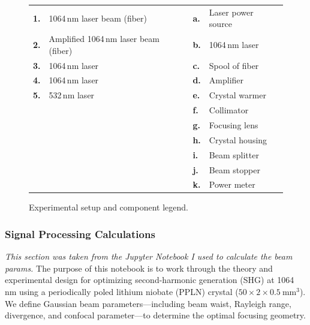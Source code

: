 \documentclass[11pt, letterpaper]{article}
\begin{document}
\begin{figure}[htbp]
{\begin{tikzpicture}[font=\sffamily]
    \end{tikzpicture}
    }
    \vspace{.5cm} %
    \renewcommand{\arraystretch}{1.2} %
    \small %
    \begin{tabular}{@{}ll | ll@{}}
        \textbf{1.} & 1064\,nm laser beam (fiber)           & \textbf{a.} & Laser power source \\
        \textbf{2.} & Amplified 1064\,nm laser beam (fiber) & \textbf{b.} & 1064\,nm laser \\
        \textbf{3.} & 1064\,nm laser                        & \textbf{c.} & Spool of fiber \\
        \textbf{4.} & 1064\,nm laser                        & \textbf{d.} & Amplifier \\
        \textbf{5.} & 532\,nm laser                         & \textbf{e.} & Crystal warmer \\
                    &                                       & \textbf{f.} & Collimator \\
                    &                                       & \textbf{g.} & Focusing lens \\
                    &                                       & \textbf{h.} & Crystal housing \\
                    &                                       & \textbf{i.} & Beam splitter \\
                    &                                       & \textbf{j.} & Beam stopper \\
                    &                                       & \textbf{k.} & Power meter \\
    \end{tabular}
    \caption{Experimental setup and component legend.} 
\end{figure}


\newpage
\subsubsection*{Signal Processing Calculations}
\textit{This section was taken from the Jupyter Notebook I used to calculate the beam params.}
The purpose of this notebook is to work through the theory and experimental design for optimizing second-harmonic generation (SHG) at 1064 nm using a periodically poled lithium niobate (PPLN) crystal ($50 \times 2 \times 0.5~\text{mm}^3$). We define Gaussian beam parameters—including beam waist, Rayleigh range, divergence, and confocal parameter—to determine the optimal focusing geometry. 
\end{document}

